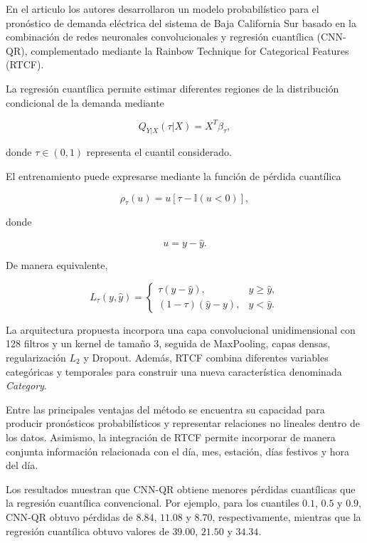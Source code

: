 En el articulo los autores desarrollaron un modelo probabilístico
para el pronóstico de demanda eléctrica del sistema de Baja
California Sur basado en la combinación de redes neuronales
convolucionales y regresión cuantílica (CNN-QR), complementado
mediante la Rainbow Technique for Categorical Features (RTCF).

La regresión cuantílica permite estimar diferentes regiones de la
distribución condicional de la demanda mediante

\begin{equation}
Q_{Y|X}(\tau|X)
=
X^{T}\beta_{\tau},
\end{equation}

donde $\tau \in (0,1)$ representa el cuantil considerado.

El entrenamiento puede expresarse mediante la función de pérdida
cuantílica

\begin{equation}
\rho_{\tau}(u)
=
u
\left[
\tau-\mathbb{I}(u<0)
\right],
\end{equation}

donde

\begin{equation}
u=y-\hat{y}.
\end{equation}

De manera equivalente,

\begin{equation}
L_{\tau}(y,\hat{y})
=
\begin{cases}
\tau(y-\hat{y}), & y\geq\hat{y},\\
(1-\tau)(\hat{y}-y), & y<\hat{y}.
\end{cases}
\end{equation}


La arquitectura propuesta incorpora una capa convolucional
unidimensional con 128 filtros y un kernel de tamaño 3, seguida de
MaxPooling, capas densas, regularización $L_2$ y Dropout. Además,
RTCF combina diferentes variables categóricas y temporales para
construir una nueva característica denominada \textit{Category}.

Entre las principales ventajas del método se encuentra su capacidad
para producir pronósticos probabilísticos y representar relaciones
no lineales dentro de los datos. Asimismo, la integración de RTCF
permite incorporar de manera conjunta información relacionada con
el día, mes, estación, días festivos y hora del día.

Los resultados muestran que CNN-QR obtiene menores pérdidas
cuantílicas que la regresión cuantílica convencional. Por ejemplo,
para los cuantiles $0.1$, $0.5$ y $0.9$, CNN-QR obtuvo pérdidas de
$8.84$, $11.08$ y $8.70$, respectivamente, mientras que la regresión
cuantílica obtuvo valores de $39.00$, $21.50$ y $34.34$.


